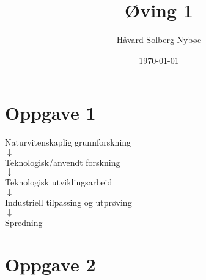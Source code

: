 \documentclass[a4paper, 12pt]{article}  %
\title{Øving 1}                         %
\author{Håvard Solberg Nybøe}           %
\date{\today}                           %
\begin{document}
\maketitle

\section*{Oppgave 1}


\parencite{sorensen2006}

\begin{center}
    Naturvitenskaplig grunnforskning
    \\$\downarrow$ 
    \\Teknologisk/anvendt forskning
    \\$\downarrow$
    \\Teknologisk utviklingsarbeid
    \\$\downarrow$
    \\Industriell tilpassing og utprøving
    \\$\downarrow$
    \\Spredning
\end{center}


\section*{Oppgave 2}

\printbibliography[heading=bibintoc] %
\end{document}
